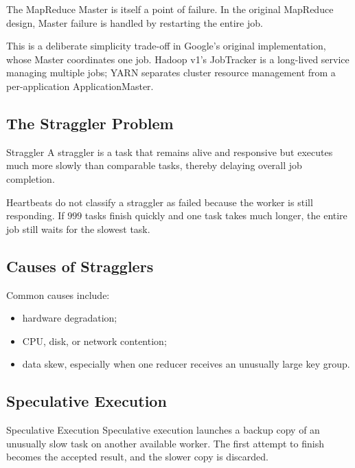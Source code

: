 \documentclass[11pt,a4paper,oneside]{book}
\begin{document}
The MapReduce Master is itself a point of failure. In the original MapReduce design, Master failure is handled by restarting the entire job.

This is a deliberate simplicity trade-off in Google's original implementation, whose Master coordinates one job. Hadoop v1's JobTracker is a long-lived service managing multiple jobs; YARN separates cluster resource management from a per-application ApplicationMaster.

\subsection{The Straggler Problem}

\begin{definitionbox}{Straggler}
A straggler is a task that remains alive and responsive but executes much more slowly than comparable tasks, thereby delaying overall job completion.
\end{definitionbox}

Heartbeats do not classify a straggler as failed because the worker is still responding. If \(999\) tasks finish quickly and one task takes much longer, the entire job still waits for the slowest task.

\subsection{Causes of Stragglers}

Common causes include:

\begin{itemize}
    \item hardware degradation;
    \item CPU, disk, or network contention;
    \item data skew, especially when one reducer receives an unusually large key group.
\end{itemize}

\subsection{Speculative Execution}

\begin{definitionbox}{Speculative Execution}
Speculative execution launches a backup copy of an unusually slow task on another available worker. The first attempt to finish becomes the accepted result, and the slower copy is discarded.
\end{definitionbox}
\end{document}
